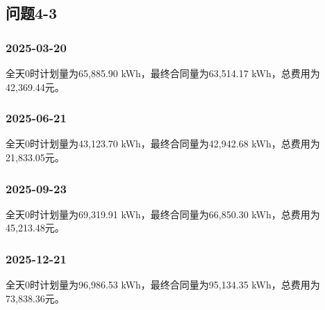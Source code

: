 \subsection{问题4-3}
\noindent\begin{minipage}{\linewidth}
\subsubsection*{2025-03-20}


全天0时计划量为65,885.90 kWh，最终合同量为63,514.17 kWh，总费用为42,369.44元。


\end{minipage}
\par\medskip
\noindent\begin{minipage}{\linewidth}
\subsubsection*{2025-06-21}


全天0时计划量为43,123.70 kWh，最终合同量为42,942.68 kWh，总费用为21,833.05元。


\end{minipage}
\par\medskip
\noindent\begin{minipage}{\linewidth}
\subsubsection*{2025-09-23}


全天0时计划量为69,319.91 kWh，最终合同量为66,850.30 kWh，总费用为45,213.48元。


\end{minipage}
\par\medskip
\noindent\begin{minipage}{\linewidth}
\subsubsection*{2025-12-21}


全天0时计划量为96,986.53 kWh，最终合同量为95,134.35 kWh，总费用为73,838.36元。


\end{minipage}
\par\medskip

